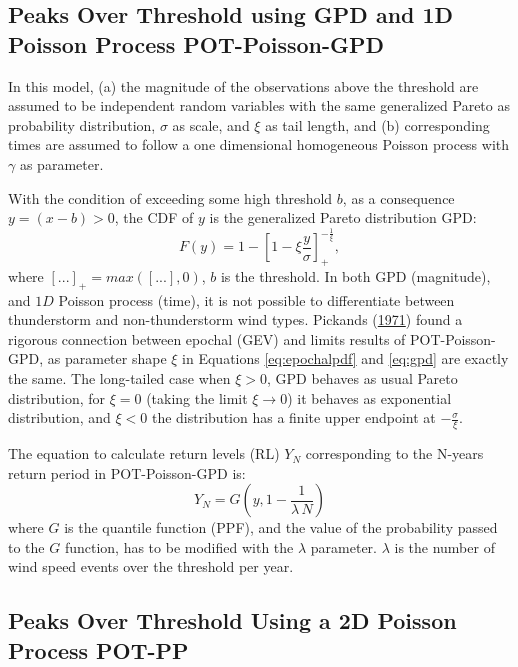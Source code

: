\documentclass[12pt,oneside]{reedthesis}
\begin{document}
\hypertarget{pot-poisson-gpd}{%
\subsection{Peaks Over Threshold using GPD and 1D Poisson Process POT-Poisson-GPD}\label{pot-poisson-gpd}}

In this model, (a) the magnitude of the observations above the threshold are assumed to be independent random variables with the same generalized Pareto as probability distribution, \(\sigma\) as scale, and \(\xi\) as tail length, and (b) corresponding times are assumed to follow a one dimensional homogeneous Poisson process with \(\gamma\) as parameter.

With the condition of exceeding some high threshold \(b\), as a consequence \(y = (x-b) > 0\), the CDF of \(y\) is the generalized Pareto distribution GPD:
\begin{equation}
        F(y) = 1 - \left[1-\xi\frac{y}{\sigma}\right]^{-\frac{1}{\xi}}_+,
  \label{eq:gpd}
\end{equation}
where \([...]_+ = max([...],0)\), \(b\) is the threshold. In both GPD (magnitude), and \(1D\) Poisson process (time), it is not possible to differentiate between thunderstorm and non-thunderstorm wind types. Pickands (\protect\hyperlink{ref-Pickands1971}{1971}) found a rigorous connection between epochal (GEV) and limits results of POT-Poisson-GPD, as parameter shape \(\xi\) in Equations \eqref{eq:epochalpdf} and \eqref{eq:gpd} are exactly the same. The long-tailed case when \(\xi>0\), GPD behaves as usual Pareto distribution, for \(\xi = 0\) (taking the limit \(\xi\rightarrow0\)) it behaves as exponential distribution, and \(\xi<0\) the distribution has a finite upper endpoint at \(-\frac{\sigma}{\xi}\).

The equation to calculate return levels (RL) \(Y_N\) corresponding to the N-years return period in POT-Poisson-GPD is:
\begin{equation}
        Y_N =G\left(y, 1-\frac{1}{\lambda\,N}\right)
  \label{eq:yngpd}
\end{equation}
where \(G\) is the quantile function (PPF), and the value of the probability passed to the \(G\) function, has to be modified with the \(\lambda\) parameter. \(\lambda\) is the number of wind speed events over the threshold per year.

\hypertarget{method-pot-pp}{%
\subsection{Peaks Over Threshold Using a 2D Poisson Process POT-PP}\label{method-pot-pp}}
\end{document}
